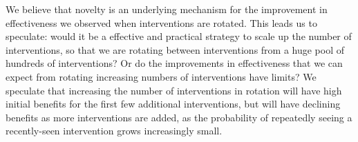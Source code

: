 We believe that novelty is an underlying mechanism for the improvement in effectiveness we observed when interventions are rotated. This leads us to speculate: would it be a effective and practical strategy to scale up the number of interventions, so that we are rotating between interventions from a huge pool of hundreds of interventions? Or do the improvements in effectiveness that we can expect from rotating increasing numbers of interventions have limits? We speculate that increasing the number of interventions in rotation will have high initial benefits for the first few additional interventions, but will have declining benefits as more interventions are added, as the probability of repeatedly seeing a recently-seen intervention grows increasingly small.




